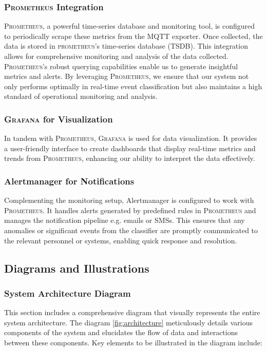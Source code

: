 \subsubsection{\textsc{Prometheus} Integration}
\textsc{Prometheus}, a powerful time-series database and monitoring tool\cite{turnbull2018monitoring}, is configured to periodically scrape these metrics from the MQTT exporter. Once collected, the data is stored in \textsc{prometheus}'s time-series database (TSDB). This integration allows for comprehensive monitoring and analysis of the data collected. \textsc{Prometheus}'s robust querying capabilities enable us to generate insightful metrics and alerts. By leveraging \textsc{Prometheus}, we ensure that our system not only performs optimally in real-time event classification but also maintains a high standard of operational monitoring and analysis.

\subsubsection{\textsc{Grafana} for Visualization}
In tandem with \textsc{Prometheus}, \textsc{Grafana} is used for data visualization. It provides a user-friendly interface to create dashboards that display real-time metrics and trends from \textsc{Prometheus}, enhancing our ability to interpret the data effectively.

\subsubsection{Alertmanager for Notifications}
Complementing the monitoring setup, Alertmanager is configured to work with \textsc{Prometheus}. It handles alerts generated by predefined rules in \textsc{Prometheus} and manages the notification pipeline e.g. emails or SMSs. This ensures that any anomalies or significant events from the classifier are promptly communicated to the relevant personnel or systems, enabling quick response and resolution.

\subsection{Diagrams and Illustrations}
\subsubsection{System Architecture Diagram}
This section includes a comprehensive diagram that visually represents the entire system architecture. The diagram \ref{fig:architecture} meticulously details various components of the system and elucidates the flow of data and interactions between these components. Key elements to be illustrated in the diagram include:

